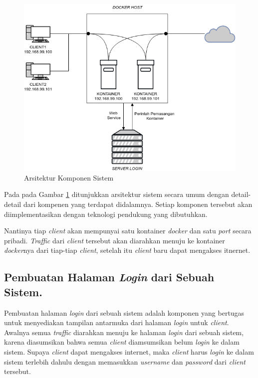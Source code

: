 \begin{figure}[H]
	\centering
	\includegraphics[width=\linewidth]{images/bab3/DIAGRAM1}
	\caption{Arsitektur Komponen Sistem}
	\label{Arsitektur Komponen Sistem}
\end{figure}

\indent Pada pada Gambar \ref{Arsitektur Komponen Sistem} ditunjukkan arsitektur sistem secara umum dengan detail-detail dari kompenen yang terdapat didalamnya. Setiap komponen tersebut akan diimplementasikan dengan teknologi pendukung yang dibutuhkan.

Nantinya tiap \textit{client}  akan mempunyai satu kontainer \textit{docker} dan satu \textit{port} secara pribadi. \textit{Traffic} dari \textit{client} tersebut akan diarahkan menuju ke kontainer \textit{docker}nya dari tiap-tiap \textit{client}, setelah itu \textit{client} baru dapat mengakses itnernet.

\subsection{Pembuatan Halaman \textit{Login} dari Sebuah Sistem.}
Pembuatan halaman \textit{login} dari sebuah sistem adalah komponen yang bertugas untuk menyediakan tampilan antarmuka dari halaman \textit{login} untuk \textit{client}. Awalnya semua \textit{traffic} diarahkan menuju ke halaman \textit{login} dari sebuah sistem, karena diasumsikan bahwa semua \textit{client} diamsumsikan belum \textit{login} ke dalam sistem. Supaya \textit{client} dapat mengakses internet, maka \textit{client} harus \textit{login} ke dalam sistem terlebih dahulu dengan memasukkan \textit{username} dan \textit{password} dari \textit{client} tersebut.

